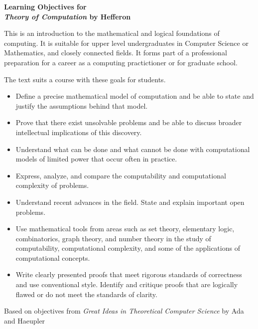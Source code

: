 \documentclass{article}
\begin{document}
\thispagestyle{empty}
\begin{center}
\large\bf Learning Objectives for \\[0.5ex]
  \textit{Theory of Computation} by Hef{}feron 
\end{center}

\vspace{1.5ex}
This is an introduction to the 
mathematical and logical foundations of computing.
It is suitable for  
upper level undergraduates in Computer Science
or Mathematics, and closely connected fields.
It forms part of a professional preparation for a career as a computing 
practictioner or for graduate school.

The text suits a course with these goals for students.
\begin{itemize}
\item
Define a precise mathematical model of computation 
and be able to state and justify the assumptions 
behind that model.
\item
Prove that there exist unsolvable problems and be able to discuss 
broader intellectual implications of this discovery. 
\item
Understand what can be done and what cannot be done
with computational models of limited power that occur often in practice.
\item
Express, analyze, and compare the computability and computational 
complexity of problems.
\item
Understand recent advances in the field.
State and explain important open problems.
\item
Use mathematical tools from areas such as set theory, elementary logic, combinatorics, graph theory, and number theory in the study of computability, computational complexity, and some of the applications of computational concepts.
\item
Write clearly presented proofs that meet rigorous standards of correctness and use conventional style.
Identify and critique proofs that are logically flawed or do not meet the standards of clarity.
\end{itemize}

\vfill
\begin{flushright}
\parbox{.65\textwidth}{\small Based on objectives from
    \textit{Great Ideas in Theoretical Computer Science}
    by Ada and Haeupler}
\end{flushright}
\end{document}
